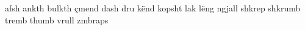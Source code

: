afsh
ankth
bulkth
çmend
dash
dru
kënd
kopsht
lak
lëng
ngjall
shkrep
shkrumb
tremb 
thumb
vrull
zmbraps
